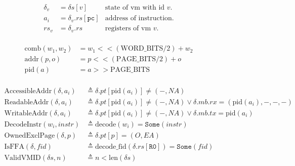 \documentclass[a4paper]{article}
\newcommand*{\defined}{\triangleq}
\newcommand*{\PPBITS}{\text{PAGE\_BITS}}
\newcommand*{\PWBITS}{\text{WORD\_BITS}}
\newcommand*{\DN}[1]{\mathtt{Done} \; {#1}}
\newcommand*{\NXT}[1]{\mathtt{Next} \; {#1}}
\newcommand*{\decode}{\text{decode}}
\newcommand*{\pid}{\text{pid}}
\newcommand{\SOME}{\mathtt{Some}}
\begin{document}
\newcommand{\reg}[1]{\texttt{{#1}}}
\newcommand{\ta}[1]{\text{to\_addr}({#1})}
\newcommand{\tw}[1]{\text{to\_word}({#1})}
\newcommand{\tv}[1]{\text{to\_vmid}({#1})}
\newcommand{\DNNXT}[1]{\DN{\NXT{ {#1} }}}
\begin{figure}[!htb]
    \begin{align*}
      \delta_v&=\delta s[v] & \text{state of vm with id }v.\\
      a_i&=\delta_v.rs[\mathtt{pc}] & \text{address of instruction}. \\
      rs_v&=\delta_v.rs & \text{registers of vm }v.
    \end{align*}
    \\
    \begin{align*}
          \text{comb}(w_{1},w_{2})&=w_{1}<<(\PWBITS/2)+w_{2}\\
    \text{addr}(p,o)&=p<<(\PPBITS/2)+o \\
    \pid(a) &= a >> \PPBITS
      \end{align*}
    \\
    \begin{align*}
      \text{AccessibleAddr}(\delta,a_i) &\defined \delta.pt[\pid(a_i)]\ne(-,NA) \\
      \text{ReadableAddr}(\delta,a_i) &\defined \delta.pt[\pid(a_i)]\ne(-,NA) \lor \delta.mb.rx=(\pid(a_i),-,-,-) \\
      \text{WritableAddr}(\delta,a_i) &\defined \delta.pt[\pid(a_i)]\ne(-,NA) \lor \delta.mb.tx=\pid(a_i) \\
      \text{DecodeInstr}(w_i,instr) &\defined \decode(w_i)=\SOME(instr)\\
      \text{OwnedExclPage}(\delta,p) & \defined \delta.pt[p]=(O,EA)\\
      \text{IsFFA}(\delta, fid) & \defined \text{decode\_fid}(\delta.rs[\reg{R0}])=\SOME(fid)\\
      \text{ValidVMID}(\delta s,n) &\defined n<\text{len}(\delta s)
      \end{align*}
  \end{figure}
\end{document}
